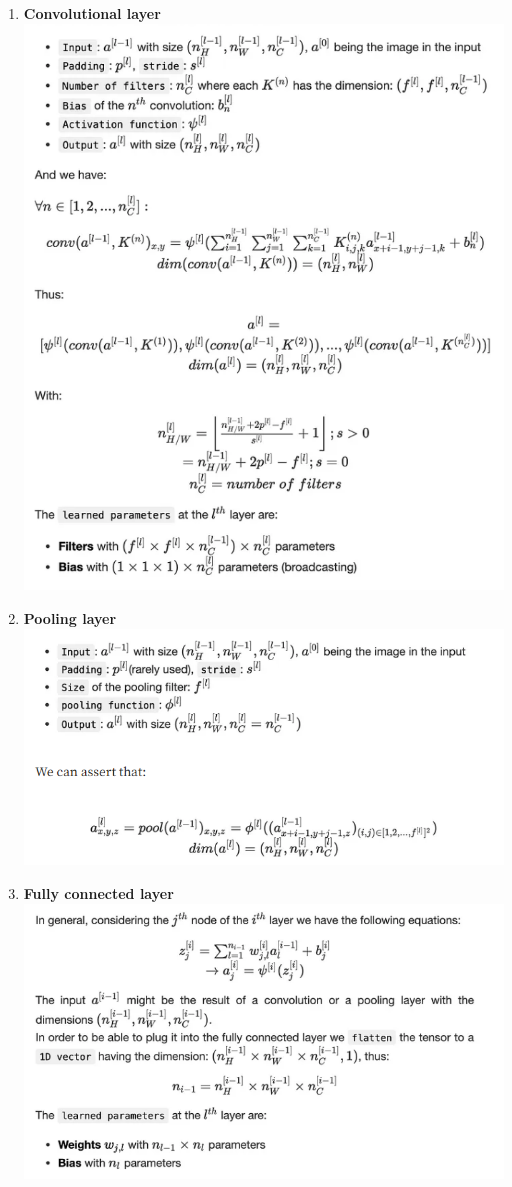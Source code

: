 \documentclass{article}
\begin{document}
\begin{enumerate}
    \item \textbf{Convolutional layer}
    \\ \includegraphics[scale = 0.6]{1st.png}
    \item \textbf{Pooling layer}
    \\ \includegraphics[scale = 0.69]{2nd.png}
    \item \textbf{Fully connected layer}
    \\ \includegraphics[scale = 0.69]{3rd.png}
\end{enumerate}
\end{document}
